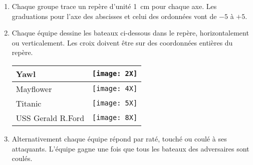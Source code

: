 \begin{TP}

\begin{enumerate}
 \item Chaque groupe trace un repère d'unité 1 cm pour chaque axe. Les graduations pour l'axe des abscisses et celui des ordonnées vont de $- 5$ à $+ 5$.
 \item Chaque équipe dessine les bateaux ci-dessous dans le repère, horizontalement ou verticalement. Les croix doivent être sur des coordonnées entières du repère. \\[0.5em]
\begin{tabularx}{\linewidth}{|X|X|}
 \hline
 Yawl & \texttt{[image: 2X]} \\\hline
 Mayflower & \texttt{[image: 4X]} \\\hline
 Titanic & \texttt{[image: 5X]} \\\hline
 USS Gerald R.Ford & \texttt{[image: 8X]} \\\hline
 \end{tabularx}
 \vspace{0.3cm}
 \item Alternativement chaque équipe répond par raté, touché ou coulé à ses attaquants. L'équipe gagne une fois que tous les bateaux des adversaires sont coulés.
 \end{enumerate}
 
\end{TP}

